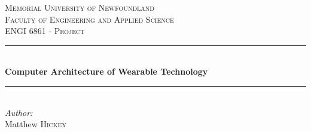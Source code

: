 \newcommand{\HRule}{\rule{\linewidth}{0.5mm}} %

\center %


\textsc{\LARGE Memorial University of Newfoundland}\\[1.5cm]
\textsc{\Large Faculty of Engineering and Applied Science}\\[0.5cm] %
\textsc{\large ENGI 6861 - Project}\\[0.5cm] %


\HRule \\[0.4cm]
{ \huge \bfseries Computer Architecture of Wearable Technology}\\[0.4cm] %
\HRule \\[1.5cm]


\Large \emph{Author:}\\
Matthew \textsc{Hickey}\\[2cm] %


